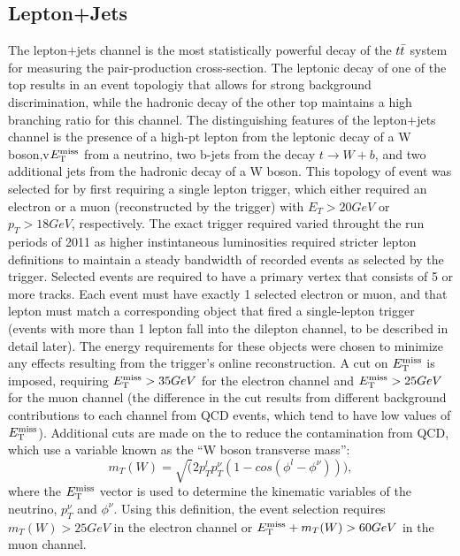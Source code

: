 \subsection{Lepton+Jets}
The lepton$+$jets channel is the most statistically powerful decay of the $t\bar{t}$ system for measuring the pair-production cross-section.
The leptonic decay of one of the top results in an event topologiy that allows for strong background discrimination, while the hadronic decay of the other top maintains a high branching ratio for this channel.
The distinguishing features of the lepton$+$jets channel is the presence of a high-pt lepton from the leptonic decay of a W boson,v$E_{\mathrm{T}}^{\mathrm{miss}}$ from a neutrino, two b-jets from the decay $t \rightarrow W+b$, and two additional jets from the hadronic decay of a W boson.
This topology of event was selected for by first requiring a single lepton trigger, which either required an electron or a muon (reconstructed by the trigger) with $E_{T} > 20 GeV$ or $p_{T} > 18 GeV$, respectively.
The exact trigger required varied throught the run periods of 2011 as higher instintaneous luminosities required stricter lepton definitions to maintain a steady bandwidth of recorded events as selected by the trigger.
Selected events are required to have a primary vertex that consists of 5 or more tracks.
Each event must have exactly 1 selected electron or muon, and that lepton must match a corresponding object that fired a single-lepton trigger (events with more than 1 lepton fall into the dilepton channel, to be described in detail later).
The energy requirements for these objects were chosen to minimize any effects resulting from the trigger's online reconstruction.
A cut on $E_{\mathrm{T}}^{\mathrm{miss}}$ is imposed, requiring $E_{\mathrm{T}}^{\mathrm{miss}} > 35 GeV$ for the electron channel and $E_{\mathrm{T}}^{\mathrm{miss}} > 25 GeV$ for the muon channel (the difference in the cut results from different background contributions to each channel from QCD events, which tend to have low values of $E_{\mathrm{T}}^{\mathrm{miss}}$).
Additional cuts are made on the to reduce the contamination from QCD, which use a variable known as the ``W boson transverse mass'':
\begin{equation}
  m_{T}(W) = \sqrt(2 p_{T}^{l} p_{T}^{\nu} (1 - cos( \phi^{l} - \phi^{\nu}))),
\end{equation} 
where the $E_{\mathrm{T}}^{\mathrm{miss}}$ vector is used to determine the kinematic variables of the neutrino, $p_{T}^{\nu}$ and $\phi^{\nu}$.
Using this definition, the event selection requires $m_{T}(W) > 25 GeV$ in the electron channel or $E_{\mathrm{T}}^{\mathrm{miss}} + m_{T}(W) > 60 GeV$ in the muon channel.



